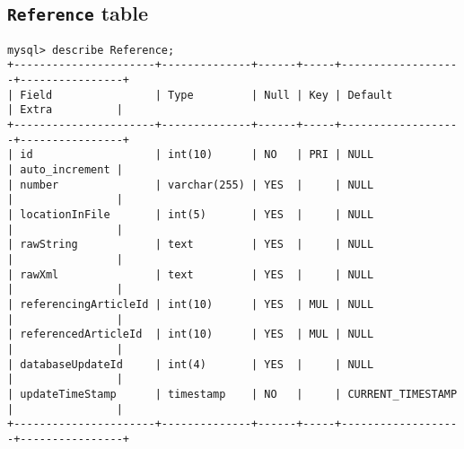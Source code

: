 {\subsection{{\tt Reference} table}
\begin{verbatim}
mysql> describe Reference;
+----------------------+--------------+------+-----+-------------------+----------------+
| Field                | Type         | Null | Key | Default           | Extra          |
+----------------------+--------------+------+-----+-------------------+----------------+
| id                   | int(10)      | NO   | PRI | NULL              | auto_increment | 
| number               | varchar(255) | YES  |     | NULL              |                | 
| locationInFile       | int(5)       | YES  |     | NULL              |                | 
| rawString            | text         | YES  |     | NULL              |                | 
| rawXml               | text         | YES  |     | NULL              |                | 
| referencingArticleId | int(10)      | YES  | MUL | NULL              |                | 
| referencedArticleId  | int(10)      | YES  | MUL | NULL              |                | 
| databaseUpdateId     | int(4)       | YES  |     | NULL              |                | 
| updateTimeStamp      | timestamp    | NO   |     | CURRENT_TIMESTAMP |                | 
+----------------------+--------------+------+-----+-------------------+----------------+
\end{verbatim}

}

